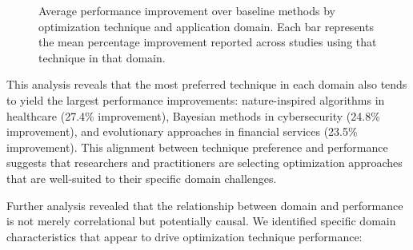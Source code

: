 \begin{figure}[h]
\centering
{}
\caption{Average performance improvement over baseline methods by optimization technique and application domain. Each bar represents the mean percentage improvement reported across studies using that technique in that domain.}
\label{fig:domain_performance}
\end{figure}

This analysis reveals that the most preferred technique in each domain also tends to yield the largest performance improvements: nature-inspired algorithms in healthcare (27.4\% improvement), Bayesian methods in cybersecurity (24.8\% improvement), and evolutionary approaches in financial services (23.5\% improvement). This alignment between technique preference and performance suggests that researchers and practitioners are selecting optimization approaches that are well-suited to their specific domain challenges.

Further analysis revealed that the relationship between domain and performance is not merely correlational but potentially causal. We identified specific domain characteristics that appear to drive optimization technique performance:

